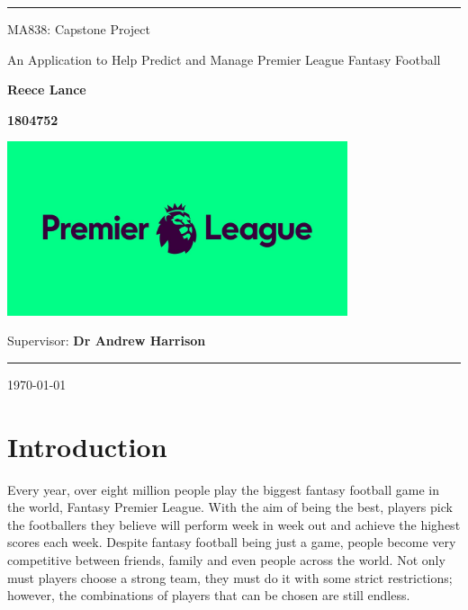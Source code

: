 \documentclass[12pt, a4paper, oneside]{book}
\numberwithin{equation}{section}
\begin{document}
\begin{center}

\noindent\textcolor{prempurple}{\rule{\linewidth}{4.8pt}}

\vspace{1cm}

{\LARGE \sc  MA838: Capstone Project}

\vspace{1.5cm}

{\Huge{An Application to Help Predict and Manage Premier League Fantasy Football}}

\vspace{1.5cm}

{\Large \bf Reece Lance}

\vspace{0.5cm}

{\Large \bf 1804752}

\vspace{1.5cm}

\centerline{\includegraphics[width=0.75\textwidth]{images/title-page/prem_logo.jpeg}}

\vspace{1.5cm}

{\Large {Supervisor:} {\bf Dr Andrew Harrison}}

\vspace{.25cm}

\noindent\textcolor{prempurple}{\rule{\linewidth}{4.8pt}}

\vspace{1cm}
{\Large \today }\\[4pt]
\end{center}
\newpage
\tableofcontents

\chapter{Introduction}\label{ch:1}

Every year, over eight million people play the biggest fantasy football game in the world, Fantasy Premier League. With the aim of being the best, players pick the footballers they believe will perform week in week out and achieve the highest scores each week. Despite fantasy football being just a game, people become very competitive between friends, family and even people across the world. Not only must players choose a strong team, they must do it with some strict restrictions; however, the combinations of players that can be chosen are still endless.
\end{document}
